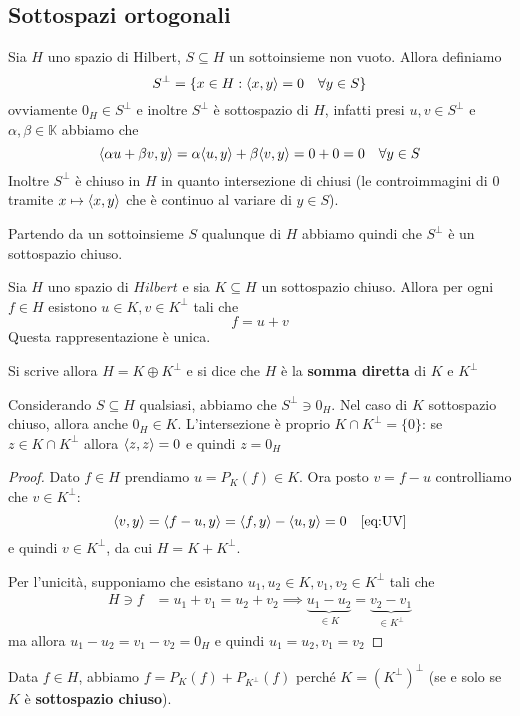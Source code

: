\subsection{Sottospazi ortogonali}
Sia \(H\) uno spazio di Hilbert, \(S \subseteq H \) un sottoinsieme non vuoto.
Allora definiamo
\[
    S^\perp = \{x \in H : {\left\langle x, y\right\rangle} = 0 \quad \forall y \in S\} 
\]
ovviamente \(0_H \in S^\perp \) e inoltre \(S^\perp \) è sottospazio di \(H\),
infatti presi \(u, v \in S^\perp \) e \(\alpha, \beta \in \mathbb{K}\) abbiamo che
\[
    {\left\langle\alpha u + \beta v, y\right\rangle} = \alpha {\left\langle u, y\right\rangle} + \beta {\left\langle v, y\right\rangle} = 0 +
    0 = 0 \quad \forall y \in S
\]
Inoltre \(S^\perp \) è chiuso in \(H\) in quanto intersezione di chiusi (le
controimmagini di 0 tramite \(x \mapsto {\left\langle x, y\right\rangle} \) che è continuo al variare
di \(y \in S\)).

Partendo da un sottoinsieme \(S\) qualunque di \(H\) abbiamo quindi che
\(S^\perp \) è un sottospazio chiuso.

\begin{theorem}\label{thm:dec_orto}
    Sia \(H\) uno spazio di \(Hilbert\) e sia \(K \subseteq H \) un sottospazio
    chiuso. Allora per ogni \(f \in H\) esistono \(u \in K, v \in K^\perp \)
    tali che \[f = u + v\] Questa rappresentazione è unica.
\end{theorem}
\begin{remark}
    Si scrive allora \(H = K \oplus K^\perp\) e si dice che \(H\) è la
    \textbf{somma diretta} di \(K\) e \(K^\perp\)
\end{remark}
\begin{remark}
    Considerando \(S \subseteq H \) qualsiasi, abbiamo che
    \(S^\perp \ni 0_H\). Nel caso di \(K\) sottospazio chiuso, allora
    anche \(0_H \in K\). L'intersezione è proprio \(K \cap K^\perp = \{0\}\): se
    \(z \in K \cap K^\perp \) allora \({\left\langle z, z\right\rangle} = 0\) e quindi \(z = 0_H\)
\end{remark}
\begin{proof}
    Dato \(f \in H\) prendiamo \(u = P_K{(f)} \in K\). Ora posto \(v = f - u\)
    controlliamo che \(v \in K^\perp \):
    \[
        {\left\langle v, y\right\rangle} = {\left\langle f - u, y\right\rangle} = {\left\langle f, y\right\rangle} - {\left\langle u, y\right\rangle} = 0 \quad\eqref{eq:UV}
    \]
    e quindi \(v \in K^\perp \), da cui \(H = K + K^\perp \).

    Per l'unicità, supponiamo che esistano \(u_1, u_{2} \in K, v_{1}, v_{2} \in
    K^\perp\) tali che 
    \begin{align*}
        H \ni f &= u_{1} + v_{1} = u_{2} + v_{2}
        \implies \underbrace{u_{1} - u_{2}}_{\in K}  = \underbrace{v_{2} -
        v_{1}}_{\in K^\perp}
    \end{align*}
    ma allora \(u_{1} - u_{2} = v_{1} - v_{2} = 0_H\) e quindi \(u_{1} = u_{2},
    v_{1} = v_{2}\)
\end{proof}
\begin{remark}
    Data \(f \in H\), abbiamo \(f = P_K{(f)} + P_{K^\perp } {(f)}\) perché \(K =
    {(K^\perp )}^\perp\) (se e solo se \(K\) è \textbf{sottospazio chiuso}).
\end{remark}

